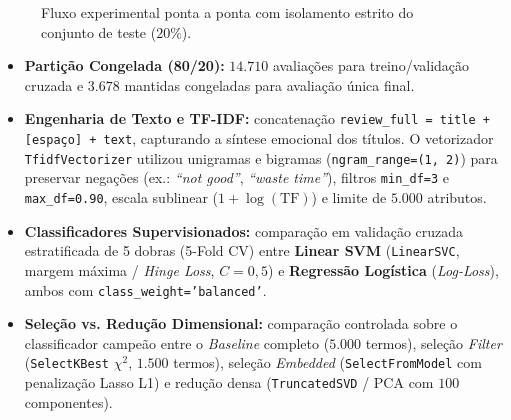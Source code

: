 \documentclass[10pt,a4paper]{article}
\begin{document}
\begin{figure}[htbp]
\centering
{}
\caption{Fluxo experimental ponta a ponta com isolamento estrito do conjunto de teste ($20\%$).}
\label{fig:pipeline}
\end{figure}

\begin{itemize}
    \item \textbf{Partição Congelada (80/20):} $14.710$ avaliações para treino/validação cruzada e $3.678$ mantidas congeladas para avaliação única final.
    \item \textbf{Engenharia de Texto e TF-IDF:} concatenação \texttt{review\_full = title + [espaço] + text}, capturando a síntese emocional dos títulos. O vetorizador \texttt{TfidfVectorizer} utilizou unigramas e bigramas (\texttt{ngram\_range=(1, 2)}) para preservar negações (ex.: \textit{``not good''}, \textit{``waste time''}), filtros \texttt{min\_df=3} e \texttt{max\_df=0.90}, escala sublinear ($1 + \log(\text{TF})$) e limite de $5.000$ atributos.
    \item \textbf{Classificadores Supervisionados:} comparação em validação cruzada estratificada de 5 dobras (5-Fold CV) entre \textbf{Linear SVM} (\texttt{LinearSVC}, margem máxima / \textit{Hinge Loss}, $C = 0{,}5$) e \textbf{Regressão Logística} (\textit{Log-Loss}), ambos com \texttt{class\_weight='balanced'}.
    \item \textbf{Seleção vs. Redução Dimensional:} comparação controlada sobre o classificador campeão entre o \textit{Baseline} completo ($5.000$ termos), seleção \textit{Filter} (\texttt{SelectKBest} $\chi^2$, $1.500$ termos), seleção \textit{Embedded} (\texttt{SelectFromModel} com penalização Lasso L1) e redução densa (\texttt{TruncatedSVD} / PCA com $100$ componentes).
\end{itemize}
\end{document}
